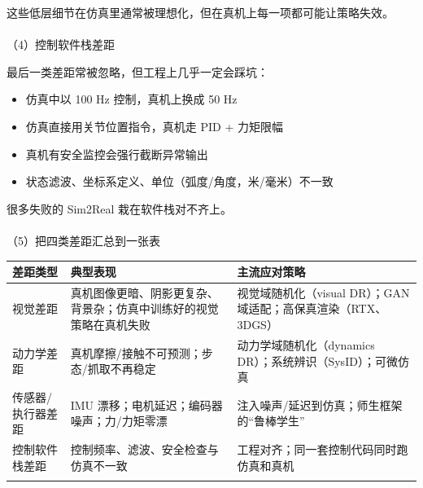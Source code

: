 \documentclass[
  chinese,
]{ctexart}
\makeatletter
\let\oldparagraph\paragraph
\renewcommand{\paragraph}{
    \@ifstar
      \xxxParagraphStar
      \xxxParagraphNoStar
  }
\newcommand{\xxxParagraphStar}[1]{\oldparagraph*{#1}\mbox{}}
\newcommand{\xxxParagraphNoStar}[1]{\oldparagraph{#1}\mbox{}}
\providecommand{\tightlist}{%
  \setlength{\itemsep}{0pt}\setlength{\parskip}{0pt}}
\makeatother
\begin{document}
这些低层细节在仿真里通常被理想化，但在真机上每一项都可能让策略失效。

\paragraph{（4）控制软件栈差距}\label{ux63a7ux5236ux8f6fux4ef6ux6808ux5deeux8ddd}

最后一类差距常被忽略，但工程上几乎一定会踩坑：

\begin{itemize}
\tightlist
\item
  仿真中以 100 Hz 控制，真机上换成 50 Hz
\item
  仿真直接用关节位置指令，真机走 PID + 力矩限幅
\item
  真机有安全监控会强行截断异常输出
\item
  状态滤波、坐标系定义、单位（弧度/角度，米/毫米）不一致
\end{itemize}

很多失败的 Sim2Real 栽在软件栈对不齐上。

\paragraph{（5）把四类差距汇总到一张表}\label{ux628aux56dbux7c7bux5deeux8dddux6c47ux603bux5230ux4e00ux5f20ux8868}

\begin{center}
\begin{tabular}{@{}>{\raggedright\arraybackslash}p{} >{\raggedright\arraybackslash}p{} >{\raggedright\arraybackslash}p{}@{}}
\toprule\noalign{}
差距类型 & 典型表现 & 主流应对策略 \\
\midrule\noalign{}
视觉差距 & 真机图像更暗、阴影更复杂、背景杂；仿真中训练好的视觉策略在真机失败 & 视觉域随机化（visual DR）；GAN 域适配；高保真渲染（RTX、3DGS） \\
动力学差距 & 真机摩擦/接触不可预测；步态/抓取不再稳定 & 动力学域随机化（dynamics DR）；系统辨识（SysID）；可微仿真 \\
传感器/执行器差距 & IMU 漂移；电机延迟；编码器噪声；力/力矩零漂 & 注入噪声/延迟到仿真；师生框架的``鲁棒学生'' \\
控制软件栈差距 & 控制频率、滤波、安全检查与仿真不一致 & 工程对齐；同一套控制代码同时跑仿真和真机 \\
\bottomrule\noalign{}
\end{tabular}
\end{center}
\end{document}
